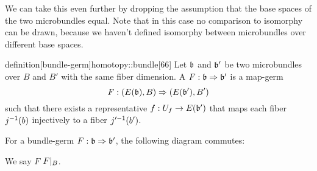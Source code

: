 \begin{myparagraph}
    We can take this even further by dropping the assumption
    that the base spaces of the two microbundles equal.
    Note that in this case no comparison to isomorphy can be drawn,
    because we haven't defined isomorphy between microbundles over different base spaces.
\end{myparagraph}

\begin{mystatement}{definition}[bundle-germ]{homotopy::bundle}[66]
    Let $\bb$ and $\bb'$ be two microbundles over $B$ and $B'$
    with the same fiber dimension.
    A  $\germdef{F}{\bb}{\bb'}$ is a map-germ
    \[ \germdef{F}{(E(\bb), B)}{(E(\bb'), B')} \]
    such that there exists a representative $f: U_f \to E(\bb')$
    that maps each fiber $j^{-1}(b)$ injectively to a fiber $j'^{-1}(b')$.
\end{mystatement}

\begin{myparagraph}
    For a bundle-germ $\germdef{F}{\bb}{\bb'}$, the following diagram commutes:
    \begin{center}
    \end{center}
    We say $F$  $F\vert_{B}$.
    
\end{myparagraph}